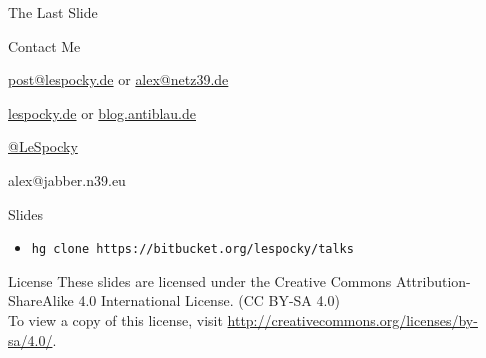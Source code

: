 \documentclass{beamer}
\begin{document}
\begin{frame}{The Last Slide}
    \begin{block}{Contact Me}
        \begin{description}[Twitter]
            \item [E-Mail] \href{mailto:post@lespocky.de}{post@lespocky.de}
                    or \href{mailto:alex@netz39.de}{alex@netz39.de}
            \item [WWW] \href{http://www.lespocky.de/}{lespocky.de} or
                    \href{http://blog.antiblau.de/}{blog.antiblau.de}
            \item [Twitter] \href{https://twitter.com/LeSpocky}{@LeSpocky}
            \item [XMPP] alex@jabber.n39.eu
        \end{description}
    \end{block}
    \begin{block}{Slides}
        \begin{itemize}
            \item \texttt{hg clone https://bitbucket.org/lespocky/talks}
        \end{itemize}
    \end{block}
    \begin{block}{License}
        These slides are licensed under the Creative Commons
        Attribution-ShareAlike 4.0 International License. (CC BY-SA 4.0) \\
        To view a copy of this license, visit
        \url{http://creativecommons.org/licenses/by-sa/4.0/}.
    \end{block}
\end{frame}
\end{document}
